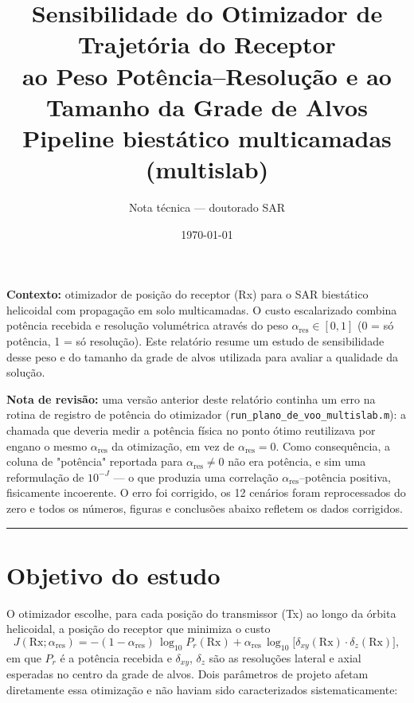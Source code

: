 \documentclass[11pt, a4paper]{article}
\title{\textbf{Sensibilidade do Otimizador de Trajetória do Receptor\\
       ao Peso Potência--Resolução e ao Tamanho da Grade de Alvos\\
       \large{Pipeline biestático multicamadas (multislab)}}}
\author{Nota técnica --- doutorado SAR}
\date{\today}
\newcommand{\Rx}{\mathrm{Rx}}
\newcommand{\dxy}{\delta_{xy}}
\newcommand{\dz}{\delta_z}
\newcommand{\alphares}{\alpha_{\mathrm{res}}}
\begin{document}

\maketitle
\thispagestyle{empty}

\noindent\textbf{Contexto:} otimizador de posição do receptor (Rx) para o SAR
biestático helicoidal com propagação em solo multicamadas. O custo escalarizado
combina potência recebida e resolução volumétrica através do peso
$\alphares \in [0,1]$ (0 = só potência, 1 = só resolução). Este relatório resume
um estudo de sensibilidade desse peso e do tamanho da grade de alvos utilizada
para avaliar a qualidade da solução.
\vspace{6pt}

\noindent\textbf{Nota de revisão:} uma versão anterior deste relatório continha
um erro na rotina de registro de potência do otimizador
(\texttt{run\_plano\_de\_voo\_multislab.m}): a chamada que deveria medir a
potência física no ponto ótimo reutilizava por engano o mesmo $\alphares$ da
otimização, em vez de $\alphares=0$. Como consequência, a coluna de "potência"
reportada para $\alphares \neq 0$ não era potência, e sim uma reformulação de
$10^{-J}$ — o que produzia uma correlação $\alphares$--potência positiva,
fisicamente incoerente. O erro foi corrigido, os 12 cenários foram
reprocessados do zero e todos os números, figuras e conclusões abaixo refletem
os dados corrigidos.
\vspace{6pt}

\noindent\rule{\linewidth}{0.4pt}

\section{Objetivo do estudo}

O otimizador escolhe, para cada posição do transmissor (Tx) ao longo da órbita
helicoidal, a posição do receptor que minimiza o custo
\[
J(\Rx;\alphares) = -(1-\alphares)\,\log_{10} P_r(\Rx) + \alphares\,\log_{10}
\bigl[\dxy(\Rx)\cdot\dz(\Rx)\bigr],
\]
em que $P_r$ é a potência recebida e $\dxy$, $\dz$ são as resoluções lateral e
axial esperadas no centro da grade de alvos. Dois parâmetros de projeto afetam
diretamente essa otimização e não haviam sido caracterizados sistematicamente:
\end{document}
